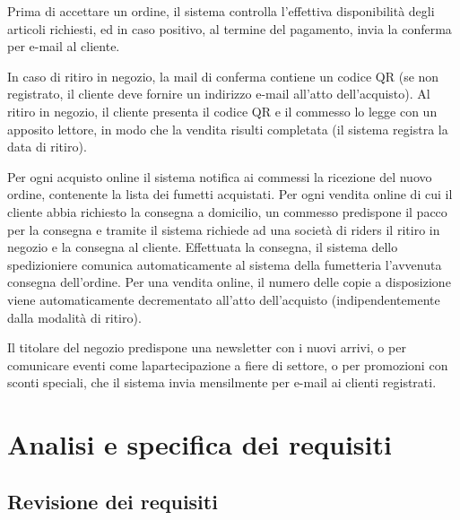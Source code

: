 \documentclass[12pt, a4paper]{article}
\begin{document}
Prima di accettare un ordine, il sistema controlla l’effettiva disponibilità degli articoli richiesti, ed in caso positivo, al termine del pagamento, invia la conferma per e-mail al cliente.

In caso di ritiro in negozio, la mail di conferma contiene un codice QR (se non registrato, il cliente deve fornire un indirizzo e-mail all’atto dell’acquisto). Al ritiro in negozio, il cliente presenta il codice QR e il commesso lo legge con un apposito lettore, in modo che la vendita risulti completata (il sistema registra la data di ritiro).

Per ogni acquisto online il sistema notifica ai commessi la ricezione del nuovo ordine, contenente la lista dei fumetti acquistati. Per ogni vendita online di cui il cliente abbia richiesto la consegna a domicilio, un commesso predispone il pacco per la consegna e tramite il sistema richiede ad una società di riders il ritiro in negozio e la consegna al cliente. Effettuata la consegna, il sistema dello spedizioniere comunica automaticamente al sistema della fumetteria l’avvenuta consegna dell’ordine. Per una vendita online, il numero delle copie a disposizione viene automaticamente decrementato all’atto dell’acquisto (indipendentemente dalla modalità di ritiro).

Il titolare del negozio predispone una newsletter con i nuovi arrivi, o per comunicare eventi come lapartecipazione a fiere di settore, o per promozioni con sconti speciali, che il sistema invia mensilmente per e-mail ai clienti registrati.

\newpage

\section{Analisi e specifica dei requisiti}
\subsection{Revisione dei requisiti}
\end{document}
